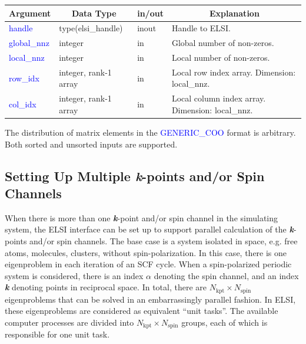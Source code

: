 \documentclass{report}
\begin{document}
\begin{tabular}[]{|p{30mm}|p{35mm}|p{15mm}|p{85mm}|}
\hline
\multicolumn{1}{|c|}{\textbf{Argument}} & \multicolumn{1}{c|}{\textbf{Data Type}} & \multicolumn{1}{c|}{\textbf{in/out}} & \multicolumn{1}{c|}{\textbf{Explanation}}\\
\hline
\textcolor{blue}{handle}      & type(elsi\_handle)    & inout & Handle to ELSI.\\
\hline
\textcolor{blue}{global\_nnz} & integer               & in    & Global number of non-zeros.\\
\hline
\textcolor{blue}{local\_nnz}  & integer               & in    & Local number of non-zeros.\\
\hline
\textcolor{blue}{row\_idx}    & integer, rank-1 array & in    & Local row index array. Dimension: local\_nnz.\\
\hline
\textcolor{blue}{col\_idx}    & integer, rank-1 array & in    & Local column index array. Dimension: local\_nnz.\\
\hline
\end{tabular}

The distribution of matrix elements in the \textcolor{blue}{GENERIC\_COO} format is arbitrary. Both sorted and unsorted inputs are supported.

\subsection{Setting Up Multiple \textbf{\textit{k}}-points and/or Spin Channels}
\label{subsec:setup_kpt}
When there is more than one \textbf{\textit{k}}-point and/or spin channel in the simulating system, the ELSI interface can be set up to support parallel calculation of the \textbf{\textit{k}}-points and/or spin channels. The base case is a system isolated in space, e.g. free atoms, molecules, clusters, without spin-polarization. In this case, there is one eigenproblem in each iteration of an SCF cycle. When a spin-polarized periodic system is considered, there is an index $\alpha$ denoting the spin channel, and an index \textbf{\textit{k}} denoting points in reciprocal space. In total, there are $N_\text{kpt} \times N_\text{spin}$ eigenproblems that can be solved in an embarrassingly parallel fashion. In ELSI, these eigenproblems are considered as equivalent ``unit tasks''. The available computer processes are divided into $N_\text{kpt} \times N_\text{spin}$ groups, each of which is responsible for one unit task.
\end{document}
